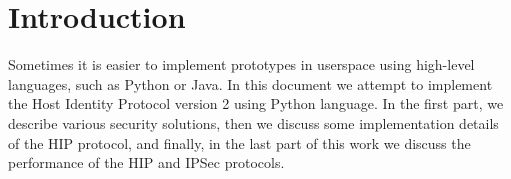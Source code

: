 \section{Introduction}
\label{section:introduction}

Sometimes it is easier to implement prototypes in userspace 
using high-level languages, such as Python or Java. In this 
document we attempt to implement the Host Identity Protocol 
version 2 using Python language. In the first part, we describe
various security solutions, then we discuss some implementation
details of the HIP protocol, and finally, in the last part
of this work we discuss the performance of the HIP and IPSec 
protocols.